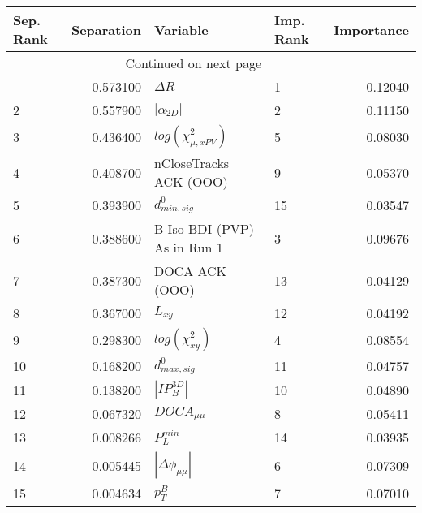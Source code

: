 \usepackage{lscape}

\begin{landscape}
\begin{longtable}{lrllr}
\toprule
Sep. Rank &  Separation &                     Variable & Imp. Rank &  Importance \\
\midrule
\endhead
\midrule
\multicolumn{3}{r}{{Continued on next page}} \\
\midrule
\endfoot

\bottomrule
\endlastfoot
        1 &    0.573100 &                   $\Delta R$ &         1 &     0.12040 \\
        2 &    0.557900 &              $|\alpha_{2D}|$ &         2 &     0.11150 \\
        3 &    0.436400 &    $log(\chi^{2}_{\mu,xPV})$ &         5 &     0.08030 \\
        4 &    0.408700 &       nCloseTracks ACK (OOO) &         9 &     0.05370 \\
        5 &    0.393900 &             $d^0_{min, sig}$ &        15 &     0.03547 \\
        6 &    0.388600 &  B Iso BDI (PVP) As in Run 1 &         3 &     0.09676 \\
        7 &    0.387300 &               DOCA ACK (OOO) &        13 &     0.04129 \\
        8 &    0.367000 &                     $L_{xy}$ &        12 &     0.04192 \\
        9 &    0.298300 &         $log(\chi^{2}_{xy})$ &         4 &     0.08554 \\
       10 &    0.168200 &             $d^0_{max, sig}$ &        11 &     0.04757 \\
       11 &    0.138200 &              $|IP_{B}^{3D}|$ &        10 &     0.04890 \\
       12 &    0.067320 &              $DOCA_{\mu\mu}$ &         8 &     0.05411 \\
       13 &    0.008266 &                $P^{min}_{L}$ &        14 &     0.03935 \\
       14 &    0.005445 &     $|\Delta \phi_{\mu\mu}|$ &         6 &     0.07309 \\
       15 &    0.004634 &                    $p^B_{T}$ &         7 &     0.07010 \\
\end{longtable}

\end{landscape}
